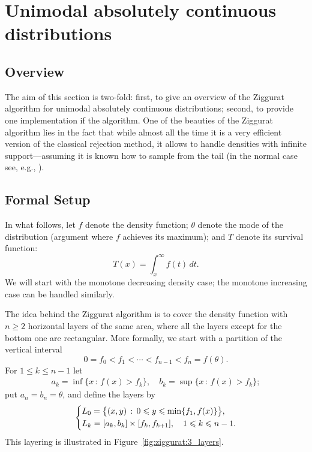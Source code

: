 \documentclass{article}
\renewcommand{\geq}{\geqslant}
\renewcommand{\leq}{\leqslant}
\theoremstyle{definition} %
\newcommand{\Mode}{\theta}
\begin{document}
\section{Unimodal absolutely continuous distributions}

\subsection{Overview}

The aim of this section is two-fold: first, to give an overview of the Ziggurat algorithm \citet{Marsaglia+Tsang} for unimodal absolutely continuous distributions; second, to provide one implementation if the algorithm. One of the beauties of the Ziggurat algorithm lies in the fact that while almost all the time it is a very efficient version of the classical rejection method, it allows to handle densities with infinite support---assuming it is known how to sample from the tail (in the normal case see, e.g., \citet{Marsaglia:64}).

\subsection{Formal Setup}

In what follows, let $f$ denote the density function; $\Mode $ denote the mode of the distribution (argument where $f$ achieves its maximum); and $T$ denote its survival function:
\[
    T(x) = \int _x ^{\infty} f(t) \,dt.
\]
We will start with the monotone decreasing density case; the monotone increasing case can be handled similarly.

The idea behind the Ziggurat algorithm is to cover the density function with $n \geq 2$ horizontal layers of the same area, where all the layers except for the bottom one are rectangular.
%
More formally, we start with a partition of the vertical interval
\[
    0 = f_0 < f_1 < \cdots < f_{n - 1} < f_{n} = f(\Mode ).
\]
For $1 \leq k \leq n - 1$ let
\begin{align*}
    a_k = \inf \big\{ x \,:\, f(x) > f_k \big\}, \quad
    b_k = \sup \big\{ x \,:\, f(x) > f_k \big\};
\end{align*}
put $a_n = b_n = \Mode $, and define the layers by
\begin{align*}
    \begin{dcases}
        L_0 = \big\{ (x, y) \,:\, 0 \leq y \leq \min \{f_1, f(x)\} \big\}, \\
        L_k = [a_k, b_k] \times [f_k, f_{k + 1}], \quad 1 \leq k \leq n - 1.
    \end{dcases}
\end{align*}
This layering is illustrated in Figure~\ref{fig:ziggurat:3_layers}.
\end{document}
